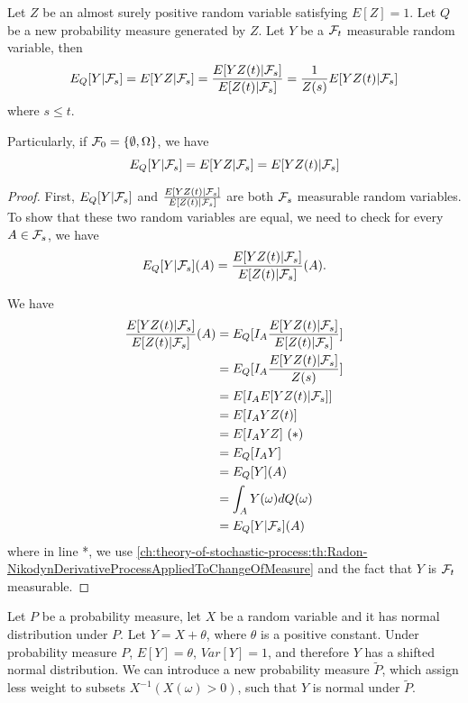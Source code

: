 \begin{refsection}
\begin{theorem}
	\cite[212]{shreve2004stochastic2}\label{ch:theory-of-stochastic-process:th:BayesTheoremForConditionalExpectation}
	Let $Z$ be an almost surely positive random variable satisfying $E[Z] = 1$. Let $Q$ be a new probability measure generated by $Z$. Let $Y$ be a $\mathcal{F}_t$ measurable random variable, then
	$$E_Q[Y|\mathcal{F}_s] =E[YZ|\mathcal{F}_s]  =\frac{E[YZ(t)|\mathcal{F}_s]}{E[Z(t)|\mathcal{F}_s]}  = \frac{1}{Z(s)} E[YZ(t)|\mathcal{F}_s]$$
	where $s\leq t$.
	
	Particularly, if $\mathcal{F}_0 = \{\emptyset,\Omega\}$, we have
	$$E_Q[Y|\mathcal{F}_s] =E[YZ|\mathcal{F}_s] = E[YZ(t)|\mathcal{F}_s]$$
\end{theorem}
\begin{proof}
	First, $E_Q[Y|\mathcal{F}_s]$ and $\frac{E[YZ(t)|\mathcal{F}_s]}{E[Z(t)|\mathcal{F}_s]}$ are both $\mathcal{F}_s$ measurable random variables. To show that these two random variables are equal, we need to check for every $A\in \mathcal{F}_s$, we have
	$$E_Q[Y|\mathcal{F}_s](A) = \frac{E[YZ(t)|\mathcal{F}_s]}{E[Z(t)|\mathcal{F}_s]}(A).$$
	
	We have
	\begin{align*}
	\frac{E[YZ(t)|\mathcal{F}_s]}{E[Z(t)|\mathcal{F}_s]}(A)&= E_Q[I_A\frac{E[YZ(t)|\mathcal{F}_s]}{E[Z(t)|\mathcal{F}_s]}]\\
	&=E_Q[I_A\frac{E[YZ(t)|\mathcal{F}_s]}{Z(s)}]\\
	&=E[I_AE[YZ(t)|\mathcal{F}_s]]\\
	&=E[I_AYZ(t)]\\
	&=E[I_AYZ] ~(*)\\
	&=E_Q[I_AY]\\
	&=E_Q[Y](A) \\
	&=\int_A Y(\omega)dQ(\omega)\\
	&= E_Q[Y|\mathcal{F}_s](A) 
	\end{align*}
	where in line *, we use \autoref{ch:theory-of-stochastic-process:th:Radon-NikodynDerivativeProcessAppliedToChangeOfMeasure} and the fact that $Y$ is $\mathcal{F}_t$ measurable.
\end{proof}

\begin{example}\cite[37]{shreve2004stochastic2}
	Let $P$ be a probability measure, let $X$ be a random variable and it has normal distribution under $P$. Let $Y=X+\theta$, where $\theta$ is a positive constant. Under probability measure $P$, $E[Y]=\theta$, $Var[Y]=1$, and therefore $Y$ has a shifted normal distribution. We can introduce a new probability measure $\tilde{P}$, which assign less weight to subsets $X^{-1}(X(\omega)>0)$, such that $Y$ is normal under $\tilde{P}$. 
	

\end{example}
\end{refsection}
